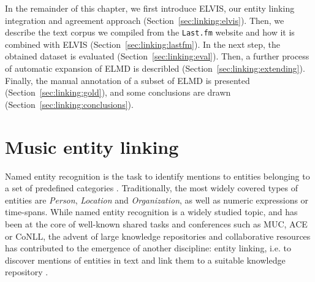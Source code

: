


In the remainder of this chapter, we first introduce \textsc{ELVIS}, our entity linking integration and agreement approach (Section~\ref{sec:linking:elvis}). Then, we describe the text corpus we compiled from the \texttt{Last.fm} website and how it is combined with ELVIS (Section~\ref{sec:linking:lastfm}). In the next step, the obtained dataset is evaluated (Section~\ref{sec:linking:eval}). Then, a further process of automatic expansion of \textsc{ELMD} is describled (Section~\ref{sec:linking:extending}). Finally, the manual annotation of a subset of \textsc{ELMD} is presented (Section~\ref{sec:linking:gold}), and some conclusions are drawn (Section~\ref{sec:linking:conclusions}). %


\section{Music entity linking}
\label{sec:linking:el}


Named entity recognition is the task to identify mentions to entities belonging to a set of predefined categories \citep{ZhouandJian2002}. Traditionally, the most widely covered types of entities are \textit{Person}, \textit{Location} and \textit{Organization}, as well as numeric expressions or time-spans. While named entity recognition is a widely studied topic, and has been at the core of well-known shared tasks and conferences \citep{Nadeau2007} such as MUC, ACE or CoNLL, the advent of large knowledge repositories and collaborative resources has contributed to the emergence of another discipline: entity linking, i.e. to discover mentions of entities in text and link them to a suitable knowledge repository \citep{Moroetal2014}.

